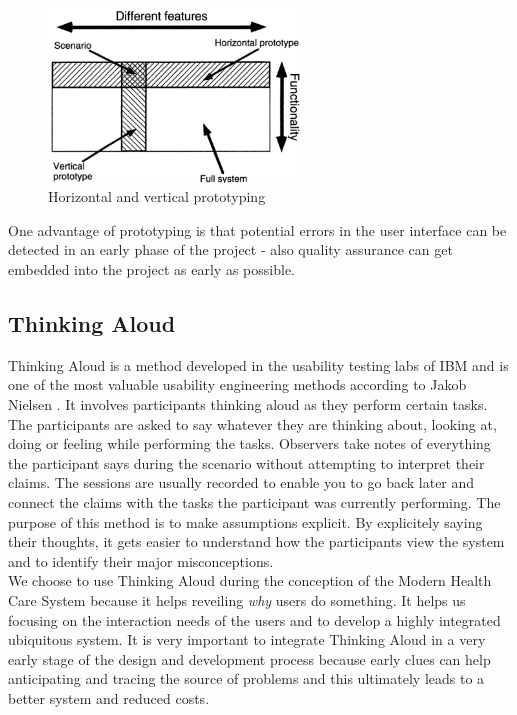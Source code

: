 \documentclass[a4paper,11pt]{article}
\begin{document}
\begin{figure}[htb]
	\centering
		\includegraphics[width=0.6\textwidth]{images/method/prototyping}
	\caption{Horizontal and vertical prototyping \citep[Page 94]{nielsen1994}}
	\label{fig:prototyping}
\end{figure}

One advantage of prototyping is that potential errors in the user interface can be detected in an early phase of the project - also quality assurance can get embedded into the project as early as possible.

\subsection{Thinking Aloud}
\label{subsect:think_aloud}

Thinking Aloud is a method developed in the usability testing labs of IBM and is one of the most valuable usability engineering methods according to Jakob Nielsen \citep[Page 195ff]{nielsen1994}. It involves participants thinking aloud as they perform certain tasks. The participants are asked to say whatever they are thinking about, looking at, doing or feeling while performing the tasks. Observers take notes of everything the participant says during the scenario without attempting to interpret their claims. The sessions are usually recorded to enable you to go back later and connect the claims with the tasks the participant was currently performing. The purpose of this method is to make assumptions explicit. By explicitely saying their thoughts, it gets easier to understand how the participants view the system and to identify their major misconceptions. \\

We choose to use Thinking Aloud during the conception of the Modern Health Care System because it helps reveiling \emph{why} users do something. It helps us focusing on the interaction needs of the users and to develop a highly integrated ubiquitous system. It is very important to integrate Thinking Aloud in a very early stage of the design and development process because early clues can help anticipating and tracing the source of problems and this ultimately leads to a better system and reduced costs.
\end{document}
